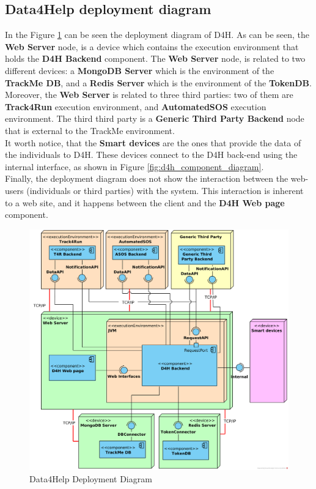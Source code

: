\documentclass[a4paper, hidelinks, 12pt]{report}
\begin{document}
	\subsection{Data4Help deployment diagram}
	In the Figure \ref{fig:d4h_deployment_diagram} can be seen the deployment diagram of D4H. As can be seen, the \textbf{Web Server} node, is a device which contains the execution environment that holds the \textbf{D4H Backend} component. The \textbf{Web Server} node, is related to two different devices: a \textbf{MongoDB Server} which is the environment of the \textbf{TrackMe DB}, and a \textbf{Redis Server} which is the environment of the \textbf{TokenDB}.\\
	
	Moreover, the \textbf{Web Server} is related to three third parties: two of them are \textbf{Track4Run} execution environment, and \textbf{AutomatedSOS} execution environment. The third third party is a \textbf{Generic Third Party Backend} node that is external to the TrackMe environment.\\
	
	It worth notice, that the \textbf{Smart devices} are the ones that provide the data of the individuals to D4H. These devices connect to the D4H back-end using the internal interface, as shown in Figure \ref{fig:d4h_component_diagram}.\\
	
	Finally, the deployment diagram does not show the interaction between the web-users (individuals or third parties) with the system. This interaction is inherent to a web site, and it happens between the client and the \textbf{D4H Web page} component.
	
		\begin{figure}[H]
			\centering
			\includegraphics[width=1\textwidth]{diagrams/d4h_deployment_diagram.png}
			\caption[Data4Help Deployment Diagram]{Data4Help Deployment Diagram}
			\label{fig:d4h_deployment_diagram}
		\end{figure}	
	
\end{document}
